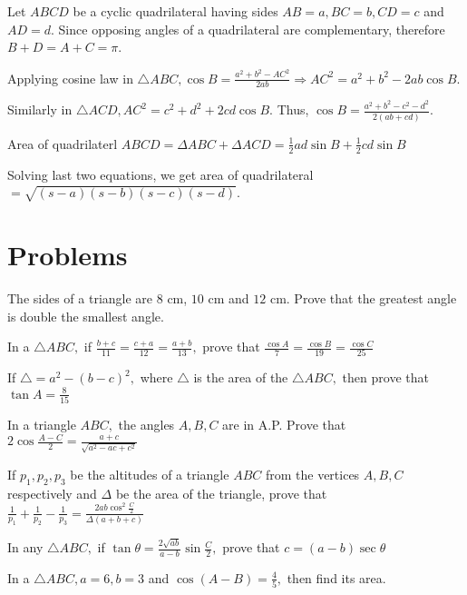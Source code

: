 \startproof
  Let $ABCD$ be a cyclic quadrilateral having sides $AB = a, BC = b, CD = c$ and $AD = d$. Since opposing angles of a quadrilateral
  are complementary, therefore $B + D = A + C = \pi$.

  Applying cosine law in $\triangle ABC, \cos B = \frac{a^2 + b^2 - AC^2}{2ab}\Rightarrow AC^2 = a^2 + b^2 - 2ab\cos B$.

  Similarly in $\triangle ACD, AC^2 = c^2 + d^2 + 2cd \cos B$. Thus, $\cos B = \frac{a^2 + b^2 - c^2 - d^2}{2(ab + cd)}$.

  Area of quadrilaterl $ABCD = \Delta ABC + \Delta ACD = \frac{1}{2}ad\sin B + \frac{1}{2}cd \sin B$

  Solving last two equations, we get area of quadrilateral $= \sqrt{(s - a)(s - b)(s - c)(s - d)}$.
\stopproof

\section{Problems}
\startitemize[n, 1*broad]
\item The sides of a triangle are $8$ cm, $10$ cm and $12$ cm. Prove that the greatest angle is double the smallest
   angle.

\item In a $\triangle ABC,$ if $\frac{b + c}{11} = \frac{c + a}{12} = \frac{a + b}{13},$ prove that $\frac{\cos
   A}{7} = \frac{\cos B}{19} = \frac{\cos C}{25}$

\item If $\triangle = a^2 - (b - c)^2,$ where $\triangle$ is the area of the $\triangle ABC,$ then prove that
   $\tan A = \frac{8}{15}$

\item In a triangle $ABC,$ the angles $A, B, C$ are in A.P. Prove that $2\cos\frac{A - C}{2} = \frac{a +
   c}{\sqrt{a^2 - ac + c^2}}$

\item If $p_1, p_2, p_3$ be the altitudes of a triangle $ABC$ from the vertices $A, B, C$ respectively and
   $\Delta$ be the area of the triangle, prove that $\frac{1}{p_1} + \frac{1}{p_2} - \frac{1}{p_3} =
   \frac{2ab\cos^2\frac{C}{2}}{\Delta(a + b + c)}$

\item In any $\triangle ABC,$ if $\tan\theta = \frac{2\sqrt{ab}}{a - b}\sin\frac{C}{2},$ prove that $c = (a -
   b)\sec\theta$

\item In a $\triangle ABC, a=6, b = 3$ and $\cos(A - B) = \frac{4}{5},$ then find its area.

